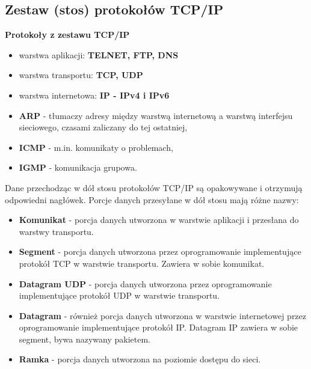 \documentclass[../main.tex]{subfiles}
\begin{document}
    \subsection{Zestaw (stos) protokołów TCP/IP}

    \textbf{Protokoły z zestawu TCP/IP}
    \begin{itemize}
        \item warstwa aplikacji:  \textbf{TELNET, FTP, DNS}
        \item warstwa transportu: \textbf{TCP, UDP}
        \item warstwa internetowa: \textbf{IP - IPv4 i IPv6}
        \item \textbf{ARP} - tłumaczy adresy między warstwą internetową a warstwą interfejsu
        sieciowego, czasami zaliczany do tej ostatniej,
        \item \textbf{ICMP} - m.in. komunikaty o problemach,
        \item \textbf{IGMP} - komunikacja grupowa.

    \end{itemize}

    Dane przechodząc w dół stosu protokołów TCP/IP są opakowywane i otrzymują
    odpowiedni nagłówek. Porcje danych przesyłane w dół stosu mają różne
    nazwy:
    \begin{itemize}
        \item \textbf{Komunikat} - porcja danych utworzona w warstwie aplikacji i przesłana do warstwy transportu.
        \item \textbf{Segment} - porcja danych utworzona przez oprogramowanie implementujące protokół TCP w warstwie transportu. Zawiera w sobie komunikat.
        \item \textbf{Datagram UDP} - porcja danych utworzona przez oprogramowanie implementujące protokół UDP w warstwie transportu.
        \item \textbf{Datagram} - również porcja danych utworzona w warstwie internetowej przez oprogramowanie implementujące protokół IP. Datagram IP zawiera w sobie segment, bywa nazywany pakietem.
        \item \textbf{Ramka} - porcja danych utworzona na poziomie dostępu do sieci.
    \end{itemize}
\end{document}
